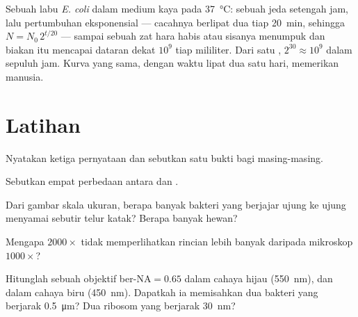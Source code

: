 \begin{example}\label{ex:b1:cell-unit-of-life:growthcurve}
Sebuah labu \emph{E. coli} dalam medium kaya pada \qty{37}{\celsius}:
sebuah jeda setengah jam, lalu pertumbuhan eksponensial --- cacahnya
berlipat dua tiap \qty{20}{min}, sehingga $N = N_0\,2^{t/20}$ --- sampai
sebuah zat hara habis atau sisanya menumpuk dan biakan itu mencapai
dataran dekat $10^9$  tiap mililiter. Dari satu ,
$2^{30} \approx 10^9$  dalam sepuluh jam. Kurva yang sama, dengan waktu lipat dua
satu hari, memerikan  manusia.
\end{example}

\section{Latihan}

\begin{exercise}[$\star$]\label{exo:b1:cell-unit-of-life:1}
Nyatakan ketiga pernyataan  dan sebutkan satu bukti bagi
masing-masing.
\end{exercise}

\begin{exercise}[$\star$]\label{exo:b1:cell-unit-of-life:2}
Sebutkan empat perbedaan antara  dan .
\end{exercise}

\begin{exercise}[$\star$]\label{exo:b1:cell-unit-of-life:3}
Dari gambar skala ukuran, berapa banyak bakteri yang berjajar ujung ke
ujung menyamai sebutir telur katak? Berapa banyak  hewan?
\end{exercise}

\begin{exercise}[$\star$]\label{exo:b1:cell-unit-of-life:4}
Mengapa  $2000\times$ tidak memperlihatkan rincian lebih
banyak daripada mikroskop $1000\times$?
\end{exercise}

\begin{exercise}[$\star\star$]\label{exo:b1:cell-unit-of-life:5}
Hitunglah  sebuah objektif ber-$\mathrm{NA} = 0.65$ dalam
cahaya hijau (\qty{550}{nm}), dan dalam cahaya biru (\qty{450}{nm}).
Dapatkah ia memisahkan dua bakteri yang berjarak \qty{0.5}{\micro m}?
Dua ribosom yang berjarak \qty{30}{nm}?
\end{exercise}

